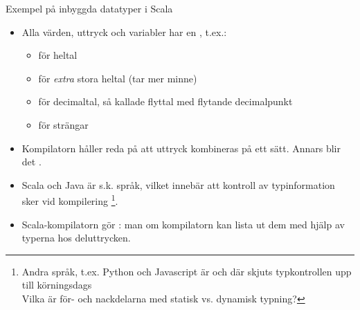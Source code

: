 \documentclass{simpleslides}
\begin{document}
  \begin{Slide}{Exempel på inbyggda datatyper i Scala}\SlideFontSmall
  \begin{itemize}
  \item Alla värden, uttryck och variabler har en \href{https://sv.wikipedia.org/wiki/Datatyp}{}, t.ex.:
  \begin{itemize}\footnotesize
  \item {} för heltal
  \item {} för \textit{extra} stora heltal (tar mer minne)
  \item {} för decimaltal, så kallade flyttal med flytande decimalpunkt
  \item {} för strängar
  \end{itemize}
  
  \item Kompilatorn håller reda på att uttryck kombineras på ett  sätt. Annars blir det .
  
  \item Scala och Java är s.k. \href{https://sv.wikipedia.org/wiki/Typsystem}{} språk, vilket innebär att kontroll av typinformation sker vid kompilering \footnote{Andra språk, t.ex. Python och Javascript är  och där skjuts typkontrollen upp till körningsdags  \\ Vilka är för- och nackdelarna med statisk vs. dynamisk typning?}.
  
  \item Scala-kompilatorn gör \href{https://en.wikipedia.org/wiki/Type_inference}{}: man  om kompilatorn kan lista ut dem med hjälp av typerna hos deluttrycken.
  
  \end{itemize}
  \end{Slide}
  
\end{document}
